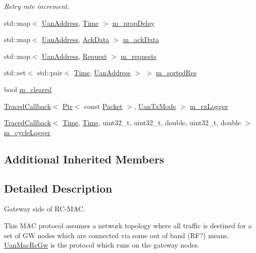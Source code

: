 \begin{DoxyCompactItemize}
\begin{DoxyCompactList}\small\item\em Retry rate increment. \end{DoxyCompactList}\item 
std\+::map$<$ \hyperlink{classns3_1_1UanAddress}{Uan\+Address}, \hyperlink{classns3_1_1Time}{Time} $>$ \hyperlink{classns3_1_1UanMacRcGw_adea1fcd9ce2850a32d2d7ff1f84c5958}{m\+\_\+prop\+Delay}
\item 
std\+::map$<$ \hyperlink{classns3_1_1UanAddress}{Uan\+Address}, \hyperlink{structns3_1_1UanMacRcGw_1_1AckData}{Ack\+Data} $>$ \hyperlink{classns3_1_1UanMacRcGw_a08da08fa5109dcd1147ef2c17aa1f061}{m\+\_\+ack\+Data}
\item 
std\+::map$<$ \hyperlink{classns3_1_1UanAddress}{Uan\+Address}, \hyperlink{structns3_1_1UanMacRcGw_1_1Request}{Request} $>$ \hyperlink{classns3_1_1UanMacRcGw_ace02d765d83abd8ea6513fd7813626e0}{m\+\_\+requests}
\item 
std\+::set$<$ std\+::pair$<$ \hyperlink{classns3_1_1Time}{Time}, \hyperlink{classns3_1_1UanAddress}{Uan\+Address} $>$ $>$ \hyperlink{classns3_1_1UanMacRcGw_afe8430ebad788663b695fe54593f5fcf}{m\+\_\+sorted\+Res}
\item 
bool \hyperlink{classns3_1_1UanMacRcGw_a6565d014e10e25e3883a1ca3f48896ee}{m\+\_\+cleared}
\item 
\hyperlink{classns3_1_1TracedCallback}{Traced\+Callback}$<$ \hyperlink{classns3_1_1Ptr}{Ptr}$<$ const \hyperlink{classns3_1_1Packet}{Packet} $>$, \hyperlink{classns3_1_1UanTxMode}{Uan\+Tx\+Mode} $>$ \hyperlink{classns3_1_1UanMacRcGw_af9c5b278e86a12e4aea40599b721f18e}{m\+\_\+rx\+Logger}
\item 
\hyperlink{classns3_1_1TracedCallback}{Traced\+Callback}$<$ \hyperlink{classns3_1_1Time}{Time}, \hyperlink{classns3_1_1Time}{Time}, uint32\+\_\+t, uint32\+\_\+t, double, uint32\+\_\+t, double $>$ \hyperlink{classns3_1_1UanMacRcGw_a4c743f84c92dcc29b476cfd229d68dd8}{m\+\_\+cycle\+Logger}
\end{DoxyCompactItemize}
\subsection*{Additional Inherited Members}


\subsection{Detailed Description}
Gateway side of R\+C-\/\+M\+AC.

This M\+AC protocol assumes a network topology where all traffic is destined for a set of GW nodes which are connected via some out of band (RF?) means. \hyperlink{classns3_1_1UanMacRcGw}{Uan\+Mac\+Rc\+Gw} is the protocol which runs on the gateway nodes.

